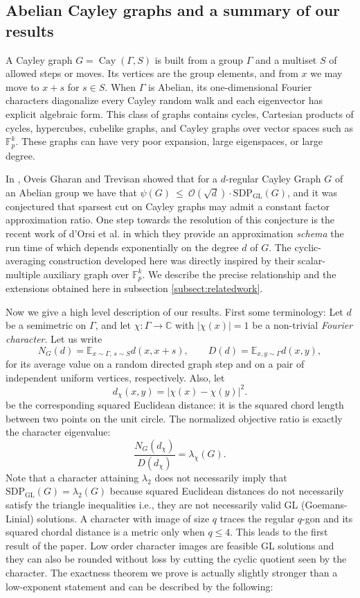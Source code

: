 \documentclass[11pt]{article}
\theoremstyle{definition}
\theoremstyle{remark}
\newcommand{\C}{\mathbb{C}}
\newcommand{\Cay}{\operatorname{Cay}}
\newcommand{\gl}{\operatorname{SDP_{GL}}}
\begin{document}
\subsection{Abelian Cayley graphs and a summary of our results}

A Cayley graph $G=\Cay(\Gamma,S)$ is built from a group $\Gamma$ and a multiset $S$ of allowed steps or moves. Its vertices are the group elements, and from $x$ we may move to $x+s$ for $s\in S$. When $\Gamma$ is Abelian, its one-dimensional Fourier characters diagonalize every Cayley random walk and each eigenvector has explicit algebraic form. This class of graphs contains cycles, Cartesian products of cycles, hypercubes, cubelike graphs, and Cayley graphs over vector spaces such as $\mathbb{F}_p^k$. These graphs can have very poor expansion, large eigenspaces, or large degree.
 
In \cite{Trevisan21}, Oveis Gharan and Trevisan showed that for a $d$-regular Cayley Graph $G$ of an Abelian group we have that $\psi(G) ~\leq~ \mathcal O (\sqrt{d}) \cdot\gl (G)$, and it was conjectured that sparsest cut on Cayley graphs may admit a constant factor approximation ratio. One step towards the resolution of this conjecture is the recent work of d'Orsi et al. \cite{dorsiaetall25} in which they provide an approximation \emph{schema} the run time of which depends exponentially on the degree $d$ of $G$.  The cyclic-averaging construction developed here was directly inspired by their scalar-multiple auxiliary graph over $\mathbb{F}_p^k$. We describe the precise relationship and the extensions obtained here in subsection \ref{subsect:relatedwork}.



Now we give a high level description of our results. First some terminology: Let $d$ be a semimetric on $\Gamma$, and let $\chi:\Gamma\to\C$ with $|\chi(x)|=1$ be a non-trivial \emph{Fourier character}. Let us write
\[
N_G(d)=\mathbb{E}_{x\sim\Gamma,\,s\sim S}d(x,x+s),
\qquad
D(d)=\mathbb{E}_{x,y\sim\Gamma}d(x,y),
\]
for its average value on a random directed graph step and on a pair of
independent uniform vertices, respectively. Also, let 
\[
  d_\chi(x,y)=|\chi(x)-\chi(y)|^2.
\]
be the corresponding squared Euclidean distance: it is the squared chord length between two points on the unit circle. The normalized objective ratio is exactly the character eigenvalue:
\[
  \frac{N_G(d_\chi)}{D(d_\chi)}=\lambda_\chi(G).
\]
Note that a character attaining $\lambda_2$ does not necessarily imply that $\gl(G)=\lambda_2(G)$ because squared Euclidean distances do not necessarily satisfy the triangle inequalities i.e., they are not necessarily valid GL (Goemans-Linial) solutions. A character with image of size $q$ traces the regular $q$-gon and its squared chordal distance is a metric only when $q \leq 4$. This leads to the first result of the paper. Low order character images are  feasible GL solutions and they can also be rounded without loss by cutting the cyclic quotient seen by the character. The exactness theorem we prove is actually slightly stronger than a low-exponent statement and can be described by the following:
\end{document}
